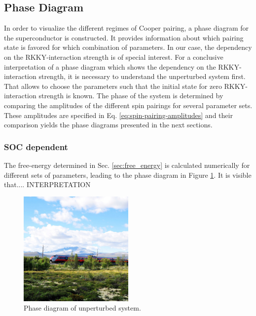 \subsection{Phase Diagram}
In order to visualize the different regimes of Cooper pairing, a phase diagram for the superconductor is constructed.
It provides information about which pairing state is favored for which combination of parameters.
In our case, the dependency on the RKKY-interaction strength is of special interest.
For a conclusive interpretation of a phase diagram which shows the dependency on the RKKY-interaction strength, it is necessary to understand the unperturbed system first.
That allows to choose the parameters such that the initial state for zero RKKY-interaction strength is known. \newline
The phase of the system is determined by comparing the amplitudes of the different spin pairings for several parameter sets. 
These amplitudes are specified in Eq. \ref{eq:spin-pairing-amplitudes} and their comparison yields the phase diagrams presented in the next sections.

\subsubsection{SOC dependent}
The free-energy determined in Sec. \ref{sec:free_energy} is calculated numerically for different sets of parameters, leading to the phase diagram in Figure \ref{fig:phasediagramm_unperturbed}.
It is visible that.... INTERPRETATION 

\begin{figure}[h]
    \centering
    \includegraphics[width=0.5\textwidth]{Images/beispiel.png}
    \caption{Phase diagram of unperturbed system.}
    \label{fig:phasediagramm_unperturbed}
\end{figure}